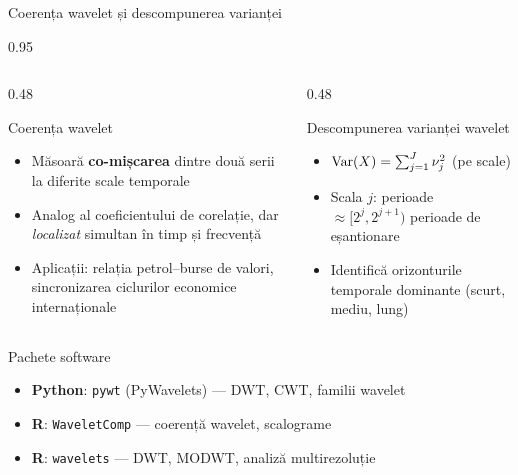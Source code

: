 \documentclass[9pt, aspectratio=169, t]{beamer}
\begin{document}
\begin{frame}{Coerența wavelet și descompunerea varianței}
    \begin{cminipage}{0.95\textwidth}
        \vspace{-0.2cm}
        {\footnotesize
        \begin{columns}[T]
            \begin{column}{0.48\textwidth}
                \begin{block}{Coerența wavelet}
                    \begin{itemize}\setlength{\itemsep}{0pt}
                        \item Măsoară \textbf{co-mișcarea} dintre două serii la diferite scale temporale
                        \item Analog al coeficientului de corelație, dar \textit{localizat} simultan în timp și frecvență
                        \item Aplicații: relația petrol--burse de valori, sincronizarea ciclurilor economice internaționale
                    \end{itemize}
                \end{block}
            \end{column}
            \begin{column}{0.48\textwidth}
                \begin{exampleblock}{Descompunerea varianței wavelet}
                    \begin{itemize}\setlength{\itemsep}{0pt}
                        \item $\text{Var}(X) = \sum_{j=1}^{J} \nu_j^2$ (pe scale)
                        \item Scala $j$: perioade $\approx [2^{j}, 2^{j+1})$ perioade de eșantionare
                        \item Identifică orizonturile temporale dominante (scurt, mediu, lung)
                    \end{itemize}
                \end{exampleblock}
            \end{column}
        \end{columns}
        }
        \vspace{-1mm}
        {\footnotesize
        \begin{block}{Pachete software}
            \begin{itemize}\setlength{\itemsep}{0pt}
                \item \textbf{Python}: \texttt{pywt} (PyWavelets) --- DWT, CWT, familii wavelet
                \item \textbf{R}: \texttt{WaveletComp} --- coerență wavelet, scalograme
                \item \textbf{R}: \texttt{wavelets} --- DWT, MODWT, analiză multirezoluție
            \end{itemize}
        \end{block}
        }
        \hfill{}
    \end{cminipage}
\end{frame}
\end{document}
